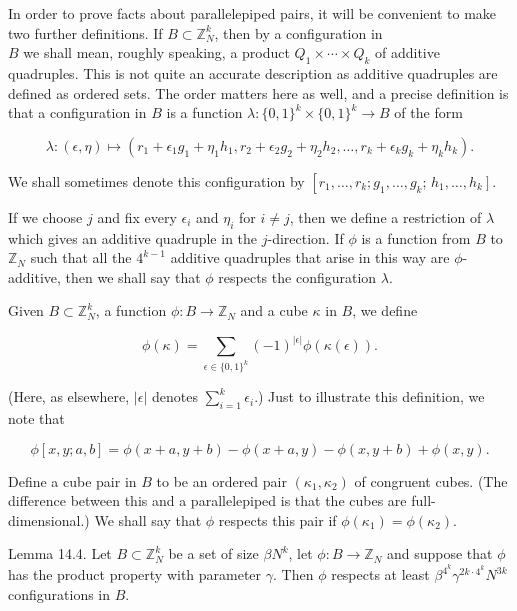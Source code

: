 \documentclass[10pt]{article}
\begin{document}
In order to prove facts about parallelepiped pairs, it will be convenient to make two further definitions. If $B \subset \mathbb{Z}_{N}^{k}$, then by a configuration in\\
$B$ we shall mean, roughly speaking, a product $Q_{1} \times \cdots \times Q_{k}$ of additive quadruples. This is not quite an accurate description as additive quadruples are defined as ordered sets. The order matters here as well, and a precise definition is that a configuration in $B$ is a function $\lambda:\{0,1\}^{k} \times\{0,1\}^{k} \rightarrow B$ of the form

$$
\lambda:(\epsilon, \eta) \mapsto\left(r_{1}+\epsilon_{1} g_{1}+\eta_{1} h_{1}, r_{2}+\epsilon_{2} g_{2}+\eta_{2} h_{2}, \ldots, r_{k}+\epsilon_{k} g_{k}+\eta_{k} h_{k}\right) .
$$

We shall sometimes denote this configuration by $\left[r_{1}, \ldots, r_{k} ; g_{1}, \ldots, g_{k}\right.$; $\left.h_{1}, \ldots, h_{k}\right]$.

If we choose $j$ and fix every $\epsilon_{i}$ and $\eta_{i}$ for $i \neq j$, then we define a restriction of $\lambda$ which gives an additive quadruple in the $j$-direction. If $\phi$ is a function from $B$ to $\mathbb{Z}_{N}$ such that all the $4^{k-1}$ additive quadruples that arise in this way are $\phi$-additive, then we shall say that $\phi$ respects the configuration $\lambda$.

Given $B \subset \mathbb{Z}_{N}^{k}$, a function $\phi: B \rightarrow \mathbb{Z}_{N}$ and a cube $\kappa$ in $B$, we define

$$
\phi(\kappa)=\sum_{\epsilon \in\{0,1\}^{k}}(-1)^{|\epsilon|} \phi(\kappa(\epsilon)) .
$$

(Here, as elsewhere, $|\epsilon|$ denotes $\sum_{i=1}^{k} \epsilon_{i}$.) Just to illustrate this definition, we note that

$$
\phi[x, y ; a, b]=\phi(x+a, y+b)-\phi(x+a, y)-\phi(x, y+b)+\phi(x, y) .
$$

Define a cube pair in $B$ to be an ordered pair $\left(\kappa_{1}, \kappa_{2}\right)$ of congruent cubes. (The difference between this and a parallelepiped is that the cubes are full-dimensional.) We shall say that $\phi$ respects this pair if $\phi\left(\kappa_{1}\right)=\phi\left(\kappa_{2}\right)$.

Lemma 14.4. Let $B \subset \mathbb{Z}_{N}^{k}$ be a set of size $\beta N^{k}$, let $\phi: B \rightarrow \mathbb{Z}_{N}$ and suppose that $\phi$ has the product property with parameter $\gamma$. Then $\phi$ respects at least $\beta^{4^{k}} \gamma^{2 k \cdot 4^{k}} N^{3 k}$ configurations in $B$.
\end{document}
